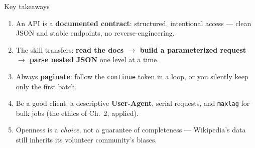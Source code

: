 \documentclass[9pt,aspectratio=169]{beamer}
\begin{document}
\begin{frame}{Key takeaways}
    \begin{enumerate}
        \item An API is a \textbf{documented contract}: structured, intentional access --- clean JSON and stable endpoints, no reverse-engineering.
        \item The skill transfers: \textbf{read the docs $\rightarrow$ build a parameterized request $\rightarrow$ parse nested JSON} one level at a time.
        \item Always \textbf{paginate}: follow the \texttt{continue} token in a loop, or you silently keep only the first batch.
        \item Be a good client: a descriptive \textbf{User-Agent}, serial requests, and \texttt{maxlag} for bulk jobs (the ethics of Ch.~2, applied).
        \item Openness is a \textit{choice}, not a guarantee of completeness --- Wikipedia's data still inherits its volunteer community's biases.
    \end{enumerate}
    \vspace{1em}
\end{frame}
\end{document}
